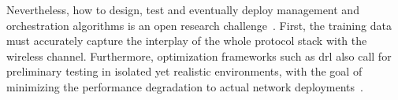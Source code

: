 Nevertheless, how to design, test and eventually deploy management and orchestration algorithms is an open research challenge~\cite{polese2022colo}.
First, the training data must accurately capture the interplay of the whole protocol stack with the wireless channel. Furthermore, optimization frameworks such as \gls{drl} also call for preliminary testing in isolated yet realistic environments, with the goal of minimizing the performance degradation to actual network deployments~\cite{lacava2022programmable, amir2023safehaul}.

